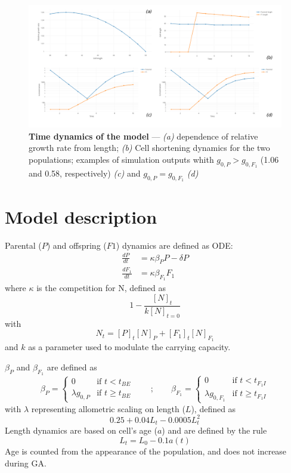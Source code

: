 \documentclass[a4paper,oneside]{book}
\begin{document}
    \begin{figure}[h]
      \includegraphics[width=\linewidth]{imgs/Figpan.pdf}
      \caption{\textbf{Time dynamics of the model} --- \textit{(a)} dependence of relative growth rate from length; \textit{(b)} Cell shortening dynamics for the two populations; examples of simulation outputs whith $g_{0,P} >g_{0,F_{1}}$ (1.06 and 0.58, respectively) \textit{(c)} and $g_{0,P} = g_{0,F_{1}}$ \textit{(d)}}\label{fdyn}
    \end{figure}
%
  \section*{Model description}
    Parental ($P$) and offspring ($F1$) dynamics are defined as ODE:\@
    \begin{align}
      \frac{dP}{dt}     &= \kappa \beta_{P}     P - \delta P \\
      \frac{dF_{1}}{dt} &= \kappa \beta_{F_{1}} F_{1}
    \end{align}
    where $\kappa$ is the competition for N, defined as
    \[
      1 - \frac{{[N]}_{t}}{k{[N]}_{t=0}}
    \]
    with 
    \[
      N_{t} = {[P]}_{t} {[N]}_{P} + {[F_{1}]}_{t} {[N]}_{F_{1}}
    \]
    and $k$ as a parameter used to modulate the carrying capacity.

    $\beta_{P}$  and $\beta_{F_{1}}$ are defined as
    \[
      \beta_{P} =
        \begin{cases}
          0               & \mbox{if } t < t_{BE} \\
          \lambda g_{0, P} & \mbox{if } t \geq t_{BE}
        \end{cases}
      \qquad;\qquad
      \beta_{F_{1}} = 
        \begin{cases}
          0                   & \mbox{if } t < t_{F_{1}I} \\
          \lambda g_{0, F_{1}} & \mbox{if } t \geq t_{F_{1}I}
        \end{cases}
    \]
    with $\lambda$ representing allometric scaling on length ($L$), defined as
    \[
      0.25 + 0.04 L_{t} - 0.0005 L_{t}^{2}
    \]
    Length dynamics are based on cell's age ($a$) and are defined by the rule
    \[
      L_{t} = L_{0} - 0.1 a(t)
    \]
    Age is counted from the appearance of the population, and does not increase during GA.\@
\end{document}
